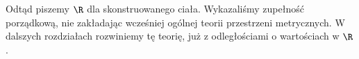 \begin{uwaga}
Odtąd piszemy $\R$ dla skonstruowanego ciała. Wykazaliśmy zupełność porządkową, nie zakładając wcześniej ogólnej teorii przestrzeni metrycznych. W dalszych rozdziałach rozwiniemy tę teorię, już z odległościami o wartościach w $\R$.
\end{uwaga}
